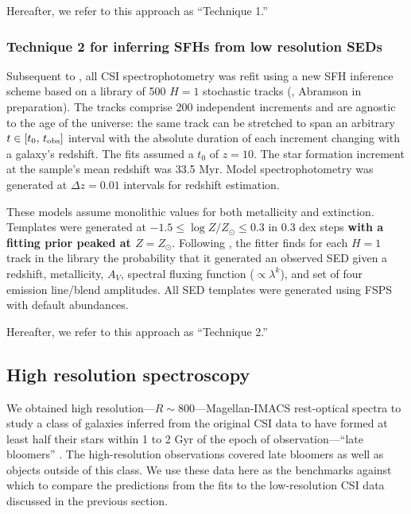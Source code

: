 \documentclass[a4paper,fleqn,usenatbib]{mnras}
\newcommand{\logZ}{\log Z/Z_{\odot}}
\newcommand{\bfr}{\bf\color{red}}
\newcommand{\tobs}{t_{\rm obs}}
\begin{document}
Hereafter, we refer to this approach as ``Technique 1.''

\subsubsection{Technique 2 for inferring SFHs from low resolution SEDs}
\label{sec:h1}

Subsequent to \citet{Dressler18}, all CSI spectrophotometry was refit using a new 
SFH inference scheme based on a library of 500 $H=1$ stochastic tracks
(\citealt{Kelson14,Kelson16,Kelson20,Abramson20b}, Abramson in preparation). The tracks comprise 200 
independent increments and are agnostic to the age of the universe: the same track can be stretched 
to span an arbitrary $t\in[t_{0},\,\tobs]$ interval with the absolute duration of each increment 
changing with a galaxy's redshift. The fits assumed a $t_{0}$ of $z=10$. The star formation 
increment at the sample's mean redshift was 33.5 Myr. Model spectrophotometry was
generated at $\Delta z = 0.01$ intervals for redshift estimation.

These models assume monolithic values for both metallicity and extinction. Templates were generated
at $-1.5\leq\logZ\leq0.3$ in 0.3 dex steps {\bfr with a fitting prior peaked at $Z=Z_{\odot}$}. Following 
\citealt{Pacifici12}, the fitter finds for each $H=1$ track in the library the probability that it generated
an observed SED given a redshift, metallicity, $A_{V}$, spectral fluxing function 
({\bfr $\propto \lambda^{k}$}), and set of four emission line/blend amplitudes. All SED templates 
were generated using FSPS with default abundances.

Hereafter, we refer to this approach as ``Technique 2.''

\subsection{High resolution spectroscopy}
\label{sec:hiRes}

We obtained high resolution---$R\sim800$---Magellan-IMACS rest-optical spectra to study 
a class of galaxies inferred from the original CSI data to have formed at least half their stars within 
1 to 2 Gyr of the epoch of observation---``late bloomers'' \citep[][]{Dressler16, Dressler18}. The 
high-resolution observations covered late bloomers as well as objects outside of this class. We use 
these data here as the benchmarks against which to compare the predictions from the fits to the 
low-resolution CSI data discussed in the previous section.
\end{document}
